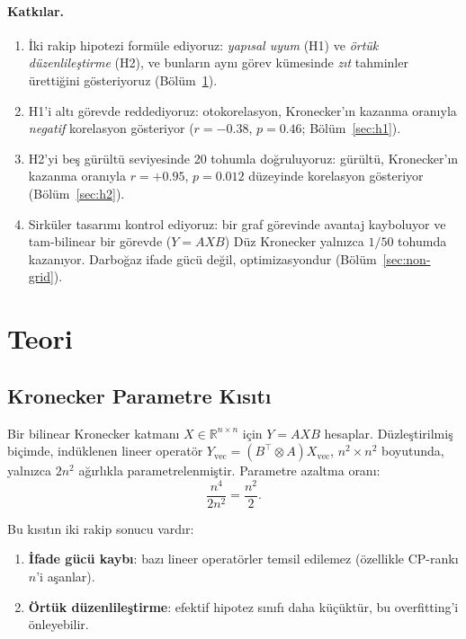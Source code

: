 \documentclass[11pt,a4paper]{article}
\begin{document}
\paragraph{Katkılar.}
\begin{enumerate}
\item İki rakip hipotezi formüle ediyoruz: \emph{yapısal uyum}
(H1) ve \emph{örtük düzenlileştirme} (H2), ve bunların aynı
görev kümesinde \emph{zıt} tahminler ürettiğini gösteriyoruz
(Bölüm~\ref{sec:theory}).
\item H1'i altı görevde reddediyoruz: otokorelasyon, Kronecker'ın
kazanma oranıyla \emph{negatif} korelasyon gösteriyor
($r = -0.38$, $p = 0.46$; Bölüm~\ref{sec:h1}).
\item H2'yi beş gürültü seviyesinde 20 tohumla doğruluyoruz:
gürültü, Kronecker'ın kazanma oranıyla $r = +0.95$,
$p = 0.012$ düzeyinde korelasyon gösteriyor
(Bölüm~\ref{sec:h2}).
\item Sirküler tasarımı kontrol ediyoruz: bir graf görevinde
avantaj kayboluyor ve tam-bilinear bir görevde ($Y = AXB$)
Düz Kronecker yalnızca $1/50$ tohumda kazanıyor. Darboğaz
ifade gücü değil, optimizasyondur (Bölüm~\ref{sec:non-grid}).
\end{enumerate}


\section{Teori}
\label{sec:theory}

\subsection{Kronecker Parametre Kısıtı}
\label{sec:constraint}

Bir bilinear Kronecker katmanı $X \in \mathbb{R}^{n \times n}$ için
$Y = A X B$ hesaplar. Düzleştirilmiş biçimde, indüklenen lineer
operatör $Y_{\text{vec}} = (B^\top \otimes A) X_{\text{vec}}$,
$n^2 \times n^2$ boyutunda, yalnızca $2n^2$ ağırlıkla
parametrelenmiştir. Parametre azaltma oranı:
\begin{equation}
\frac{n^4}{2n^2} = \frac{n^2}{2}.
\label{eq:reduction}
\end{equation}

Bu kısıtın iki rakip sonucu vardır:
\begin{enumerate}
\item \textbf{İfade gücü kaybı}: bazı lineer operatörler temsil
edilemez (özellikle CP-rankı $n$'i aşanlar).
\item \textbf{Örtük düzenlileştirme}: efektif hipotez sınıfı daha
küçüktür, bu overfitting'i önleyebilir.
\end{enumerate}
\end{document}
